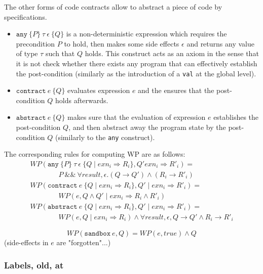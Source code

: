 The other forms of code contracts allow to abstract a piece of code by specifications.
\begin{itemize}
\item $\texttt{any}~\{ P \}~\tau~\epsilon~\{ Q \}$ is a
  non-deterministic expression which requires the precondition $P$ to
  hold, then makes some side effects $\epsilon$ and returns any value
  of type $\tau$ such that $Q$ holds. This construct acts as an axiom
  in the sense that it is not check whether there exists any program
  that can effectively establish the post-condition (similarly as the
  introduction of a \texttt{val} at the global level).
\item $\texttt{contract}~e~\{ Q \}$ evaluates expression $e$ and the
  ensures that the post-condition $Q$ holds afterwards.
\item $\texttt{abstract}~e~\{ Q \}$ makes sure that the evaluation of
  expression $e$ establishes the post-condition $Q$, and then abstract
  away the program state by the post-condition $Q$ (similarly to the
  \texttt{any} construct).
\end{itemize}
The corresponding rules for computing WP are as follows:
\[
\begin{array}{l}
  WP(\texttt{any}~\{ P \}~\tau~\epsilon~\{ Q \mid exn_i \Rightarrow R_i \} ,
  Q'  exn_i \Rightarrow R'_i) = \\
  \qquad\qquad P \mathop{\&\&} \forall result, \epsilon.
  (Q \rightarrow Q') \land (R_i \rightarrow R'_i) \\
  WP(\texttt{contract}~e~\{ Q \mid exn_i \Rightarrow R_i \} ,
  Q' \mid exn_i \Rightarrow R'_i) = \\
  \qquad\qquad WP(e,Q \land Q' \mid exn_i \Rightarrow R_i \land R'_i) \\
  WP(\texttt{abstract}~e~\{ Q \mid exn_i \Rightarrow R_i \} ,
  Q' \mid exn_i \Rightarrow R'_i) = \\
  \qquad\qquad WP(e,Q \mid exn_i \Rightarrow R_i) \land
  \forall result, \epsilon, Q \rightarrow Q' \land R_i \rightarrow R'_i
\end{array}
\]

\[
WP(\texttt{sandbox}~e, Q) = WP(e,true) \land Q
\]
(side-effects in $e$ are "forgotten"...)

\subsubsection{Labels, old, at}

\todo{}

